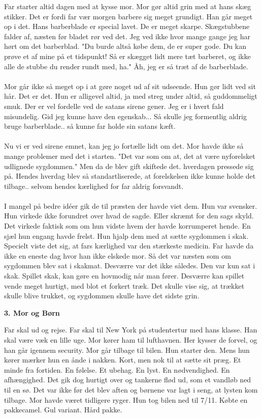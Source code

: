 \documentclass[]{article}
\begin{document}
Far starter altid dagen med at kysse mor. Mor gør altid grin med at hans skæg stikker. Det er fordi far vær morgen barbere sig meget grundigt. Han går meget op i det. Hans barberblade er special lavet. De er meget skarpe. Skægstubbene falder af, næsten før bladet rør ved det. Jeg ved ikke hvor mange gange jeg har hørt om det barberblad. "Du burde altså købe dem, de er super gode. Du kan prøve et af mine på et tidspunkt! Så er skægget lidt mere tæt barberet, og ikke alle de stubbe du render rundt med, ha." Åh, jeg er så træt af de barberblade. 
\\ \\
Mor går ikke så meget op i at gøre noget ud af sit udseende. Hun gør lidt ved sit hår. Det er det. Hun er alligevel altid, ja med streg under altid, så guddommeligt smuk. Der er vel fordelle ved de satans sirene gener. Jeg er i hvert fald misundelig. Gid jeg kunne have den egenskab... Så skulle jeg formentlig aldrig bruge barberblade.. så kunne far holde sin satans kæft. 
\\ \\
Nu vi er ved sirene emnet, kan jeg jo fortælle lidt om det. Mor havde ikke så mange problemer med det i starten. "Det var som om at, det at være nyforelsket udlignede sygdommen." Men da de blev gift skiftede det. hverdagen pressede sig på. Hendes hverdag blev så standartliserede, at forelskelsen ikke kunne holde det tilbage.. selvom hendes kærlighed for far aldrig forsvandt.
\\ \\
I mangel på bedre idéer gik de til præsten der havde viet dem. Hun var svensker. Hun virkede ikke forundret over hvad de sagde. Eller skræmt for den sags skyld. Det virkede faktisk som om hun vidste hvem der havde korrumperet hende. En sjæl hun engang havde frelst. Hun hjalp dem med at sætte sygdommen i skak. Specielt viste det sig, at fars kærlighed var den stærkeste medicin. Far havde da ikke en eneste dag hvor han ikke elskede mor. Så det var næsten som om sygdommen blev sat i skakmat. Desværre var det ikke således. Den var kun sat i skak. Spillet skak, kan gøre en hovmodig når man fører. Desværre kan spillet vende meget hurtigt, med blot et forkert træk. Det skulle vise sig, at trækket skulle blive trukket, og sygdommen skulle have det sidste grin.

\begin{center}
	\large\textbf{3. Mor og Børn}
\end{center}

Far skal ud og rejse. Far skal til New York på studentertur med hans klasse. Han skal være væk en lille uge. Mor kører ham til lufthavnen. Her kysser de forvel, og han går igennem security. Mor går tilbage til bilen. Hun starter den. Mens hun kører mærker hun en ånde i nakken. Kort, men nok til at sætte sit præg. Et minde fra fortiden. En følelse. Et ubehag. En lyst. En nødvendighed. En afhængighed. Det gik dog hurtigt over og tankerne flød ud, som et vandløb ned til en sø. Det var ikke før det blev aften og børnene var lagt i seng, at lysten kom tilbage. Mor havde været tidligere ryger. Hun tog bilen ned til 7/11. Købte en pakkecamel. Gul variant. Hård pakke. 
\\ \\
\end{document}
